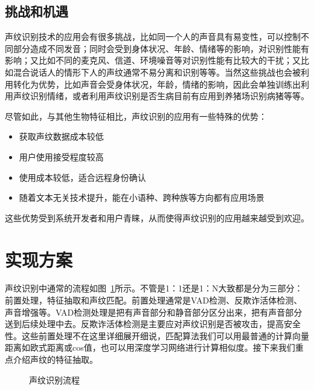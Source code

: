 \subsection{挑战和机遇}

声纹识别技术的应用会有很多挑战，比如同一个人的声音具有易变性，可以控制不同部分造成不同发音；同时会受到身体状况、年龄、情绪等的影响，对识别性能有影响；又比如不同的麦克风、信道、环境噪音等对识别性能有比较大的干扰；又比如混合说话人的情形下人的声纹通常不易分离和识别等等。当然这些挑战也会被利用转化为优势，比如声音会受身体状况，年龄，情绪的影响，因此会单独训练出利用声纹识别情绪，或者利用声纹识别是否生病目前有应用到养猪场识别病猪等等。

尽管如此，与其他生物特征相比，声纹识别的应用有一些特殊的优势：
\begin{itemize}
	\item 获取声纹数据成本较低
	\item 用户使用接受程度较高
	\item 使用成本较低，适合远程身份确认
	\item 随着文本无关技术提升，能在小语种、跨种族等方向都有应用场景
\end{itemize}
这些优势受到系统开发者和用户青睐，从而使得声纹识别的应用越来越受到欢迎。

\section{实现方案}
声纹识别中通常的流程如图~\ref{pic:vpr}所示。不管是1：1还是1：N大致都是分为三部分：前置处理，特征抽取和声纹匹配。前置处理通常是VAD检测、反欺诈活体检测、声音增强等。VAD检测处理是把有声音部分和静音部分区分出来，把有声音部分送到后续处理中去。反欺诈活体检测是主要应对声纹识别是否被攻击，提高安全性。这些前置处理不在这里详细展开细说，匹配算法我们可以用最普通的计算向量距离如欧式距离或cos值，也可以用深度学习网络进行计算相似度。接下来我们重点介绍声纹的特征抽取。
\begin{figure}
	\centering
	\caption{声纹识别流程}
	\label{pic:vpr}
\end{figure}

